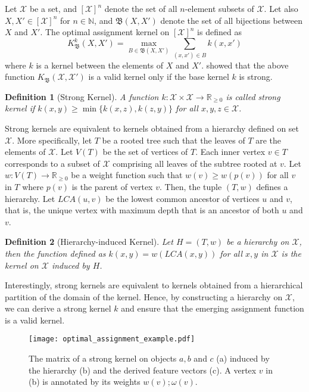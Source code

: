 \documentclass[twoside,11pt]{article}
\newtheorem{definition}{Definition}
\begin{document}
Let $\mathcal{X}$ be a set, and $[\mathcal{X}]^n$ denote the set of all $n$-element subsets of $\mathcal{X}$.
Let also $X,X' \in [\mathcal{X}]^n$ for $n \in \mathbb{N}$, and $\mathfrak{B}(X,X')$ denote the set of all bijections between $X$ and $X'$.
The optimal assignment kernel on $[\mathcal{X}]^n$ is defined as
\begin{equation}\label{eq:valid_assignment_kernel}
  K_\mathfrak{B}^k(X,X') = \max_{B \in \mathfrak{B}(X,X')} \sum_{(x,x') \in B} k(x,x')
\end{equation}
where $k$ is a kernel between the elements of $X$ and $X'$.
 showed that the above function $K_\mathfrak{B}(\mathcal{X},\mathcal{X}')$ is a valid kernel only if the base kernel $k$ is strong.
\begin{definition}[Strong Kernel]
  A function $k : \mathcal{X} \times \mathcal{X} \rightarrow \mathbb{R}_{\geq 0}$ is called strong kernel if $k(x,y) \geq \min\{ k(x,z),k(z,y) \}$ for all $x,y,z \in \mathcal{X}$.
\end{definition}
Strong kernels are equivalent to kernels obtained from a hierarchy defined on set $\mathcal{X}$.
More specifically, let $T$ be a rooted tree such that the leaves of $T$ are the elements of $\mathcal{X}$.
Let $V(T)$ be the set of vertices of $T$.
Each inner vertex $v \in T$ corresponds to a subset of $\mathcal{X}$ comprising all leaves of the subtree rooted at $v$.
Let $w : V(T) \rightarrow \mathbb{R}_{\geq 0}$ be a weight function such that $w(v) \geq w(p(v))$ for all $v$ in $T$ where $p(v)$ is the parent of vertex $v$.
Then, the tuple $(T,w)$ defines a hierarchy.
Let $LCA(u,v)$ be the lowest common ancestor of vertices $u$ and $v$, that is, the unique vertex with maximum depth that is an ancestor of both $u$ and $v$.
\begin{definition}[Hierarchy-induced Kernel]
  Let $H = (T,w)$ be a hierarchy on $\mathcal{X}$, then the function defined as $k(x,y) = w(LCA(x,y))$ for all $x,y$ in $\mathcal{X}$ is the kernel on $\mathcal{X}$ induced by $H$.
\end{definition}
Interestingly, strong kernels are equivalent to kernels obtained from a hierarchical partition of the domain of the kernel. 
Hence, by constructing a hierarchy on $\mathcal{X}$, we can derive a strong kernel $k$ and ensure that the emerging assignment function is a valid kernel.

\begin{figure}[t]
  \centering
  \texttt{[image: optimal\_assignment\_example.pdf]}
    \caption{The matrix of a strong kernel on objects $a,b$ and $c$ (a) induced by the hierarchy (b) and the derived feature vectors (c). A vertex $v$ in (b) is annotated by its weights $w(v);\omega(v)$.}
    \label{fig:optimal_assignment_example}
\end{figure}
\end{document}
